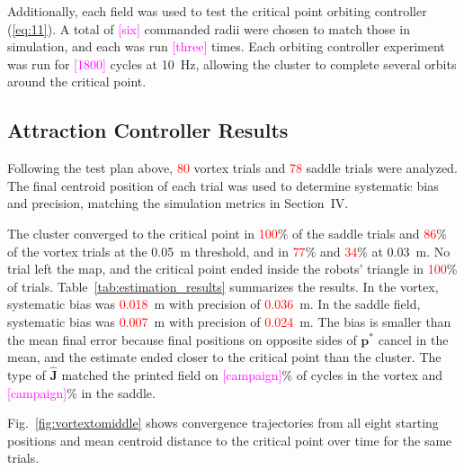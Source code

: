 \documentclass[lettersize,journal]{IEEEtran}
\newcommand{\syn}[1]{\textcolor{red}{#1}}            %
\newcommand{\open}[1]{\textcolor{magenta}{[#1]}}     %
\begin{document}
Additionally, each field was used to test the critical point orbiting controller (\ref{eq:11}). A total of \open{six} commanded radii were chosen to match those in simulation, and each was run \open{three} times. Each orbiting controller experiment was run for \open{1800} cycles at 10~Hz, allowing the cluster to complete several orbits around the critical point. %

 \subsection{Attraction Controller Results}

Following the test plan above, \syn{80} vortex trials and \syn{78} saddle trials were analyzed. The final centroid position of each trial was used to determine systematic bias and precision, matching the simulation metrics in Section~IV. %

The cluster converged to the critical point in \syn{100}\% of the saddle trials and \syn{86}\% of the vortex trials at the 0.05~m threshold, and in \syn{77}\% and \syn{34}\% at 0.03~m. No trial left the map, and the critical point ended inside the robots' triangle in \syn{100}\% of trials. Table~\ref{tab:estimation_results} summarizes the results. In the vortex, systematic bias was \syn{0.018}~m with precision of \syn{0.036}~m. In the saddle field, systematic bias was \syn{0.007}~m with precision of \syn{0.024}~m. The bias is smaller than the mean final error because final positions on opposite sides of $\mathbf{p}^*$ cancel in the mean, and the estimate ended closer to the critical point than the cluster. The type of $\hat{\mathbf{J}}$ matched the printed field on \open{campaign}\% of cycles in the vortex and \open{campaign}\% in the saddle. %

Fig.~\ref{fig:vortextomiddle} shows convergence trajectories from all eight starting positions and mean centroid distance to the critical point over time for the same trials.
\end{document}
